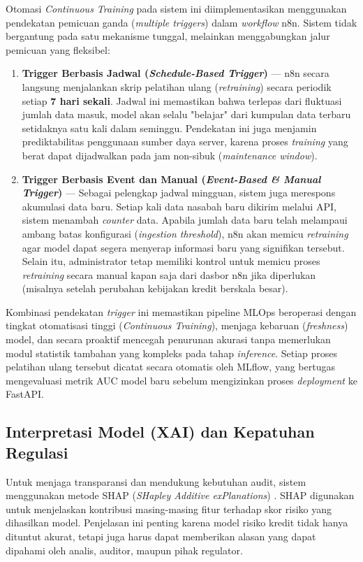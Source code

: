 Otomasi \textit{Continuous Training} pada sistem ini diimplementasikan menggunakan pendekatan pemicuan ganda (\textit{multiple triggers}) dalam \textit{workflow} n8n. Sistem tidak bergantung pada satu mekanisme tunggal, melainkan menggabungkan jalur pemicuan yang fleksibel:

\begin{enumerate}
    \item \textbf{Trigger Berbasis Jadwal (\textit{Schedule-Based Trigger})} --- n8n secara langsung menjalankan skrip pelatihan ulang (\textit{retraining}) secara periodik setiap \textbf{7 hari sekali}. Jadwal ini memastikan bahwa terlepas dari fluktuasi jumlah data masuk, model akan selalu "belajar" dari kumpulan data terbaru setidaknya satu kali dalam seminggu. Pendekatan ini juga menjamin prediktabilitas penggunaan sumber daya server, karena proses \textit{training} yang berat dapat dijadwalkan pada jam non-sibuk (\textit{maintenance window}).

    \item \textbf{Trigger Berbasis Event dan Manual (\textit{Event-Based \& Manual Trigger})} --- Sebagai pelengkap jadwal mingguan, sistem juga merespons akumulasi data baru. Setiap kali data nasabah baru dikirim melalui API, sistem menambah \textit{counter} data. Apabila jumlah data baru telah melampaui ambang batas konfigurasi (\textit{ingestion threshold}), n8n akan memicu \textit{retraining} agar model dapat segera menyerap informasi baru yang signifikan tersebut. Selain itu, administrator tetap memiliki kontrol untuk memicu proses \textit{retraining} secara manual kapan saja dari dasbor n8n jika diperlukan (misalnya setelah perubahan kebijakan kredit berskala besar).
\end{enumerate}

Kombinasi pendekatan \textit{trigger} ini memastikan pipeline MLOps beroperasi dengan tingkat otomatisasi tinggi (\textit{Continuous Training}), menjaga kebaruan (\textit{freshness}) model, dan secara proaktif mencegah penurunan akurasi tanpa memerlukan modul statistik tambahan yang kompleks pada tahap \textit{inference}. Setiap proses pelatihan ulang tersebut dicatat secara otomatis oleh MLflow, yang bertugas mengevaluasi metrik AUC model baru sebelum mengizinkan proses \textit{deployment} ke FastAPI.

\subsection{Interpretasi Model (XAI) dan Kepatuhan Regulasi}
Untuk menjaga transparansi dan mendukung kebutuhan audit, sistem menggunakan metode SHAP (\textit{SHapley Additive exPlanations}) \cite{ye2025unlocking, rafi2024explainable}. SHAP digunakan untuk menjelaskan kontribusi masing-masing fitur terhadap skor risiko yang dihasilkan model. Penjelasan ini penting karena model risiko kredit tidak hanya dituntut akurat, tetapi juga harus dapat memberikan alasan yang dapat dipahami oleh analis, auditor, maupun pihak regulator.

